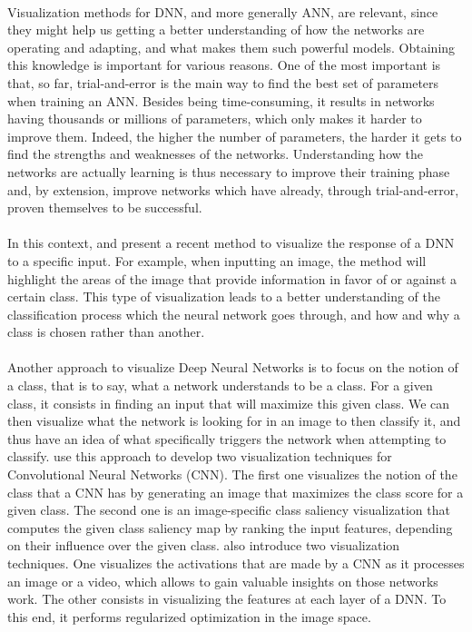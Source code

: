 \documentclass[a4paper]{article}
\begin{document}
\paragraph{}Visualization methods for DNN, and more generally ANN, are relevant, since they might help us getting a better understanding of how the networks are operating and adapting, and what makes them such powerful models. Obtaining this knowledge is important for various reasons. One of the most important is that, so far, trial-and-error is the main way to find the best set of parameters when training an ANN. Besides being time-consuming, it results in networks having thousands or millions of parameters, which only makes it harder to improve them. Indeed, the higher the number of parameters, the harder it gets to find the strengths and weaknesses of the networks. Understanding how the networks are actually learning is thus necessary to improve their training phase and, by extension, improve networks which have already, through trial-and-error, proven themselves to be successful.

\paragraph{}In this context, \citep{ZintgrafICLR2017} and \citep{Zintgraf2017} present a recent method to visualize the response of a DNN to a specific input. For example, when inputting an image, the method will highlight the areas of the image that provide information in favor of or against a certain class. This type of visualization leads to a better understanding of the classification process which the neural network goes through, and how and why a class is chosen rather than another. 

\paragraph{}Another approach to visualize Deep Neural Networks is to focus on the notion of a class, that is to say, what a network understands to be a class. For a given class, it consists in finding an input that will maximize this given class. We can then visualize what the network is looking for in an image to then classify it, and thus have an idea of what specifically triggers the network when attempting to classify. \citep{Simonyan2014} use this approach to develop two visualization techniques for Convolutional Neural Networks (CNN). The first one visualizes the notion of the class that a CNN has by generating an image that maximizes the class score for a given class. The second one is an image-specific class saliency visualization that computes the given class saliency map by ranking the input features, depending on their influence over the given class. \citep{Yosinski2015} also introduce two visualization techniques. One visualizes the activations that are made by a CNN as it processes an image or a video, which allows to gain valuable insights on those networks work. The other consists in visualizing the features at each layer of a DNN. To this end, it performs regularized optimization in the image space.
\end{document}
